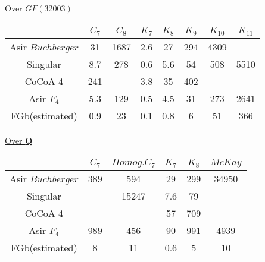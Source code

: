 \begin{slide}{}

\underline{Over $GF(32003)$}
\begin{center}
\begin{tabular}{|c||c|c|c|c|c|c|c|} \hline
		& $C_7$ & $C_8$ & $K_7$ & $K_8$ & $K_9$ & $K_{10}$ & $K_{11}$ \\ \hline
Asir $Buchberger$ 	& 31 & 1687  & 2.6  & 27 & 294  & 4309 & --- \\ \hline
Singular & 8.7 & 278 & 0.6 & 5.6 & 54 & 508 & 5510 \\ \hline
CoCoA 4 & 241 & & 3.8 & 35 & 402 & &  \\ \hline\hline
Asir $F_4$ 	& 5.3 & 129 & 0.5  & 4.5 & 31  & 273 & 2641 \\ \hline
FGb(estimated)	& 0.9 & 23 & 0.1 & 0.8 & 6 & 51 & 366 \\ \hline
\end{tabular}
\end{center}

\underline{Over {\bf Q}}

\begin{center}
\begin{tabular}{|c||c|c|c|c|c|} \hline
		& $C_7$ & $Homog. C_7$ & $K_7$ & $K_8$ & $McKay$ \\ \hline
Asir $Buchberger$ 	& 389 & 594 & 29 & 299 & 34950 \\ \hline
Singular & & 15247 & 7.6 & 79 & \\ \hline
CoCoA 4 & & & 57 & 709 & \\ \hline\hline
Asir $F_4$ 	&  989 & 456 & 90 & 991 & 4939 \\ \hline
FGb(estimated)	& 8 &11 & 0.6 & 5 & 10 \\ \hline
\end{tabular}
\end{center}
\end{slide}

